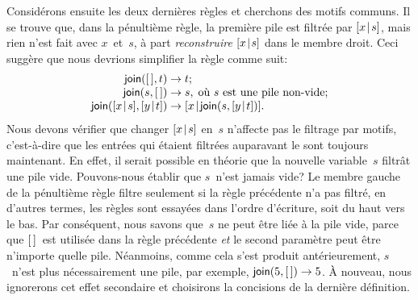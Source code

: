 Considérons ensuite les deux dernières règles et cherchons des motifs
communs. Il se trouve que, dans la pénultième règle, la première pile
est filtrée par \([{x}\!\mid\!{s}]\), mais rien n'est fait avec
\(x\)~et~\(s\), à part \emph{reconstruire} \([{x}\!\mid\!{s}]\) dans le
membre droit. Ceci suggère que nous devrions simplifier la règle
comme suit:
\begin{equation*}
\begin{array}{r@{\;}l@{\;}l}
\fun{join}(\el,t) & \rightarrow & t;\\
\fun{join}(s,\el) & \rightarrow & s,\;
  \text{où \(s\) est une pile non-vide};\\
\fun{join}(\cons{x}{s},\cons{y}{t}) & \rightarrow &
  \cons{x}{\fun{join}(s,\cons{y}{t})}.
\end{array}
\end{equation*}
Nous devons vérifier que changer \([{x}\!\mid\!{s}]\) en~\(s\) n'affecte
pas le filtrage par motifs, c'est-à-dire que les entrées qui étaient
filtrées auparavant le sont toujours maintenant. En effet, il serait
possible en théorie que la nouvelle variable~\(s\) filtrât une pile
vide. Pouvons-nous établir que \(s\)~n'est jamais vide? Le membre
gauche de la pénultième règle filtre seulement si la règle précédente
n'a pas filtré, en d'autres termes, les règles sont essayées dans
l'ordre d'écriture, soit du haut vers le bas. Par conséquent, nous
savons que~\(s\) ne peut être liée à la pile vide, parce que
\([\,]\)~est utilisée dans la règle précédente \emph{et} le second
paramètre peut être n'importe quelle pile. Néanmoins, comme cela s'est
produit antérieurement, \(s\)~n'est plus nécessairement une pile, par
exemple, \(\textsf{join}(5,[\,]) \rightarrow 5\). À nouveau, nous
ignorerons cet effet secondaire et choisirons la concisions de la
dernière définition.

